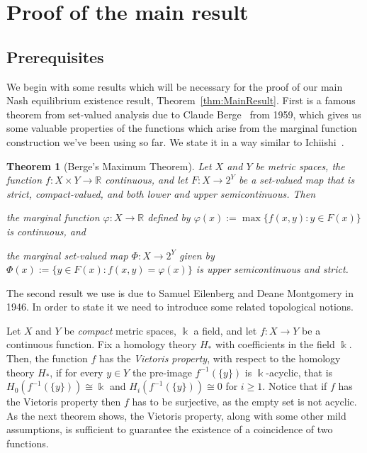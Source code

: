 \documentclass[a4paper,11pt,reqno,english]{amsart}
\newtheorem{theorem}{Theorem}[section]
\theoremstyle{definition}
\begin{document}
\section{Proof of the main result}

\subsection{Prerequisites}

We begin with some results which will be necessary for the proof of our main Nash equilibrium existence result, Theorem~\ref{thm:MainResult}. First is a famous theorem from set-valued analysis due to Claude Berge~\cite[Ch.VI.3,\,Thm.\,1]{Berge1997} from 1959, which gives us some valuable properties of the functions which arise from the marginal function construction we've been using so far. We state it in a way similar to Ichiishi~\cite[Thm.\,2.3.1]{Ichiishi_1983}.

\begin{theorem}[Berge's Maximum Theorem]\label{thm:MaximumTheorem}
	Let $X$ and $Y$ be metric spaces, the function  $f\colon X\times Y\longrightarrow \mathbb{R}$ continuous, and let $F\colon X\longrightarrow 2^Y$ be a set-valued map that is strict, compact-valued, and both lower and upper semicontinuous.
	Then
	\begin{compactenum}[\rm \quad (1)]
		\item the marginal function $\varphi\colon X\longrightarrow \mathbb{R}$ defined by $\varphi(x):=\max\{f(x,y)\colon y\in F(x)\}$ is continuous, and
		\item the marginal set-valued map $\Phi\colon X\longrightarrow 2^Y$ given by $\Phi(x):= \{y\in F(x)\colon f(x,y)=\varphi(x)\}$ is upper semicontinuous and strict.
	\end{compactenum}
\end{theorem}


\medskip
The second result we use is due to Samuel Eilenberg and Deane Montgomery \cite[Thm.\,3]{EilenbergDeane1946} in 1946.
In order to state it we need to introduce some related topological notions.

Let $X$ and $Y$ be {\em compact} metric spaces, $\Bbbk$ a field, and let $f\colon X\longrightarrow Y$ be a continuous function.
Fix a homology theory $H_*$ with coefficients in the field $\Bbbk$.
Then, the function $f$ has the \textit{Vietoris property}, with respect to the homology theory $H_*$, if for every $y\in Y$ the pre-image $f^{-1}(\{y\})$ is $\Bbbk$-acyclic, that is $H_0(f^{-1}(\{y\}))\cong\Bbbk$ and $H_i(f^{-1}(\{y\}))\cong 0$ for $i\geq 1$.
Notice that if $f$ has the Vietoris property then $f$ has to be surjective, as the empty set is not acyclic. As the next theorem shows, the Vietoris property, along with some other mild assumptions, is sufficient to guarantee the existence of a coincidence of two functions.
\end{document}
